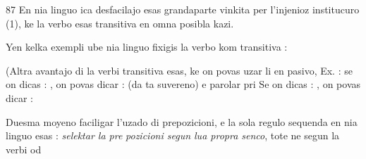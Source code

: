 \begin{VUpage}[91]{87}
En nia linguo ica desfacilajo esas grandaparte vinkita\nl
per l'injenioz institucuro (1), ke la verbo esas transitiva\nl
en omna posibla kazi.

Yen kelka exempli ube nia linguo fixigis la verbo kom\nl
transitiva : 

(Altra avantajo di la verbi transitiva esas, ke on povas\nl
uzar li en pasivo, Ex. : se on dicas : , on\nl
povas dicar :  (da ta suvereno) e parolar pri\nl
{} Se on dicas : , on\nl
povas dicar : 

Duesma moyeno faciligar l'uzado di prepozicioni, e la\nl
sola regulo sequenda en nia linguo esas : \textit{selektar la pre}\cc
\textit{pozicioni segun lua propra senco}, tote ne segun la verbi od\parplein
\end{VUpage}

